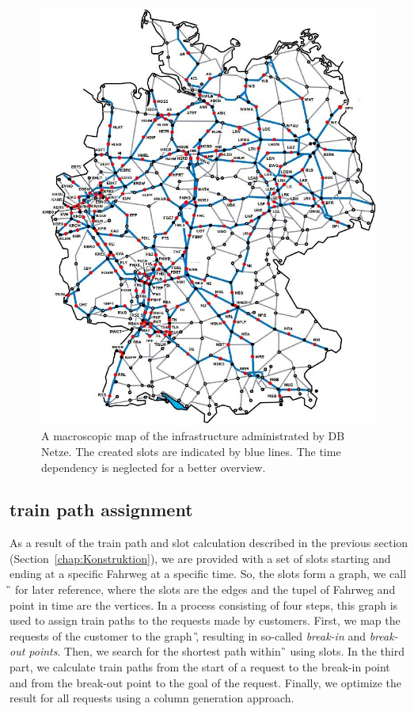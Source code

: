 %
\begin{figure}[tb]
	\centering
	\includegraphics[scale=0.40]{Bilder/STA-Karte.jpg}
	\caption{A macroscopic map of the infrastructure administrated by DB Netze. The created slots are indicated by blue lines. The time dependency is neglected for a better overview.}
	\label{fig:STAKarte}
\end{figure}


\subsection{train path assignment}
\label{chap:Belegung}
%
As a result of the train path and slot calculation described in the previous section (Section~\ref{chap:Konstruktion}), we are provided with a set of slots starting and ending at a specific Fahrweg at a specific time. So, the slots form a graph, we call \G\, for later reference, where the slots are the edges and the tupel of Fahrweg and point in time are the vertices. In a process consisting of four steps, this graph is used to assign train paths to the requests made by customers. First, we map the requests of the customer to the graph \G, resulting in so-called \emph{break-in} and \emph{break-out points}. Then, we search for the shortest path within \G\, using slots. In the third part, we calculate train paths from the start of a request to the break-in point and from the break-out point to the goal of the request. Finally, we optimize the result for all requests using a column generation approach.

